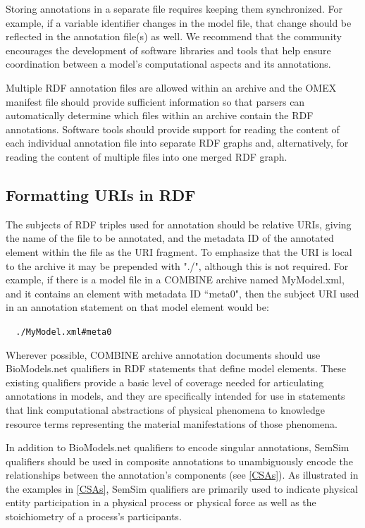 \documentclass[pdftex,rgb,dvipsnames,svgnames,hyperref,table]{report}
\begin{document}
Storing annotations in a separate file requires keeping them synchronized. For example, if a variable identifier changes in the model file, that change should be reflected in the annotation file(s) as well. We recommend that the community encourages the development of software libraries and tools that help ensure coordination between a model’s computational aspects and its annotations.

Multiple RDF annotation files are allowed within an archive and the OMEX manifest file should provide sufficient information so that parsers can automatically determine which files within an archive contain the RDF annotations. Software tools should provide support for reading the content of each individual annotation file into separate RDF graphs and, alternatively, for reading the content of multiple files into one merged RDF graph.


\subsection{Formatting URIs in RDF}
The subjects of RDF triples used for annotation should be relative URIs, giving the name of the file to be annotated, and the metadata ID of the annotated element within the file as the URI fragment. To emphasize that the URI is local to the archive it may be prepended with "./", although this is not required. For example, if there is a model file in a COMBINE archive named MyModel.xml, and it contains an element with metadata ID ``meta0", then the subject URI used in an annotation statement on that model element would be:

\verb|  ./MyModel.xml#meta0|

Wherever possible, COMBINE archive annotation documents should use BioModels.net qualifiers in RDF statements that define model elements. These existing qualifiers provide a basic level of coverage needed for articulating annotations in models, and they are specifically intended for use in statements that link computational abstractions of physical phenomena to knowledge resource terms representing the material manifestations of those phenomena. 

In addition to BioModels.net qualifiers to encode singular annotations, SemSim qualifiers should be used in composite annotations to unambiguously encode the relationships between the annotation's components (see \ref{CSAs}). As illustrated in the examples in \ref{CSAs}, SemSim qualifiers are primarily used to indicate physical entity participation in a physical process or physical force as well as the stoichiometry of a process's participants.
\end{document}
